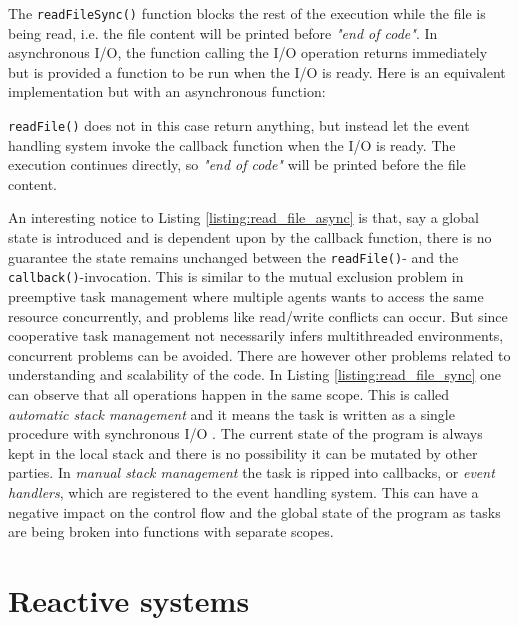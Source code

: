 

The \lstinline{readFileSync()} function blocks the rest of the execution while
the file is being read, i.e. the file content will be printed before
\textit{"end of code"}. In asynchronous I/O, the function calling the I/O
operation returns immediately but is provided a function to be run when the I/O
is ready. Here is an equivalent implementation but with an asynchronous
function:



\lstinline{readFile()} does not in this case return anything, but instead let
the event handling system invoke the callback function when the I/O is ready.
The execution continues directly, so \textit{"end of code"} will be printed
before the file content.

An interesting notice to Listing \ref{listing:read_file_async} is that, say a
global state is introduced and is dependent upon by the callback function,
there is no guarantee the state remains unchanged between the
\lstinline{readFile()}- and the \lstinline{callback()}-invocation. This is
similar to the mutual exclusion problem in preemptive task management where
multiple agents wants to access the same resource concurrently, and problems
like read/write conflicts can occur. But since cooperative task management not
necessarily infers multithreaded environments, concurrent problems can be
avoided. There are however other problems related to understanding and
scalability of the code. In Listing \ref{listing:read_file_sync} one can
observe that all operations happen in the same scope. This is called
\textit{automatic stack management} and it means the task is written as a
single procedure with synchronous I/O \cite{adya2002cooperative}. The current
state of the program is always kept in the local stack and there is no
possibility it can be mutated by other parties. In \textit{manual stack
management} the task is ripped into callbacks, or \textit{event handlers},
which are registered to the event handling system. This can have a negative
impact on the control flow and the global state of the program as tasks are
being broken into functions with separate scopes.

\section{Reactive systems}

